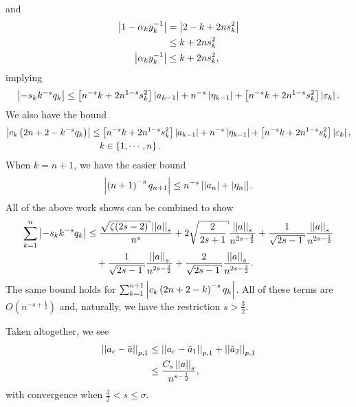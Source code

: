 %
and
%
\begin{align}
    \left| 1 - \alpha_{k}y_{k}^{-1} \right| &= \left| 2 - k + 2ns_{k}^{2} \right| \nonumber\\
        &\le k + 2ns_{k}^{2} \nonumber\\
    \left| \alpha_{k}y_{k}^{-1} \right| &\le k + 2ns_{k}^{2},
\end{align}
%
implying
%
\begin{equation}
    \left| -s_{k}k^{-s}q_{k} \right| \le \left[ n^{-s}k + 2n^{1-s}s_{k}^{2} \right]
        \left| a_{k-1} \right| + n^{-s}\left| \eta_{k-1} \right|
        + \left[ n^{-s}k +2n^{1-s}s_{k}^{2} \right]\left| \varepsilon_{k} \right|.
\end{equation}
%
We also have the bound
%
\begin{align}
    \left| c_{k}\left( 2n+2-k^{-s}q_{k} \right) \right|
    &\le \left[ n^{-s}k + 2n^{1-s}s_{k}^{2} \right]
        \left| a_{k-1} \right| + n^{-s}\left| \eta_{k-1} \right|
        + \left[ n^{-s}k +2n^{1-s}s_{k}^{2} \right]\left| \varepsilon_{k} \right|, \nonumber\\
    &\quad k\in\left\{ 1,\cdots,n \right\}.
\end{align}
%
When $k=n+1$, we have the easier bound
%
\begin{equation}
    \left| \left( n+1 \right)^{-s}q_{n+1} \right|
        \le n^{-s}\left[ \left| a_{n} \right| + \left| \eta_{n} \right| \right].
\end{equation}
%
All of the above work shows can be combined to show
%
\begin{align}
    \sum_{k=1}^{n} \abs{-s_{k}k^{-s}q_{k}} &\le
        \frac{\sqrt{\zeta(2s-2)}\norm{a}_{s}}{n^{s}}
        + 2\sqrt{\frac{2}{2s+1}}\frac{\norm{a}_{s}}{n^{2s-\frac{3}{2}}}
        + \frac{1}{\sqrt{2s-1}}\frac{\norm{a}_{s}}{n^{2s-\frac{1}{2}}}
            \nonumber\\
    &\quad+ \frac{1}{\sqrt{2s-1}}\frac{\norm{a}_{s}}{n^{2s-\frac{3}{2}}}
        + \frac{2}{\sqrt{2s-1}}\frac{\norm{a}_{s}}{n^{2s-\frac{3}{2}}}.
\end{align}
%
The same bound holds for $\sum_{k=1}^{n+1}\left| c_{k}\left( 2n+2-k \right)^{-s}q_{k} \right|$.
All of these terms are $O(n^{-s+\frac{1}{2}})$
and, naturally, we have the restriction $s>\frac{3}{2}$.

Taken altogether, we see
%
\begin{align}
    \left| \left| a_{c} - \tilde{a} \right| \right|_{p,1}
        &\le \left| \left| a_{c} - \tilde{a}_{1} \right| \right|_{p,1} + \left| \left| \tilde{a}_{2} \right| \right|_{p,1}
        \nonumber\\
    &\le \frac{C_{s}\left| \left| a \right| \right|_{s}}{n^{s-\frac{1}{2}}},
\end{align}
%
with convergence when $\frac{3}{2}<s\le\sigma$.

